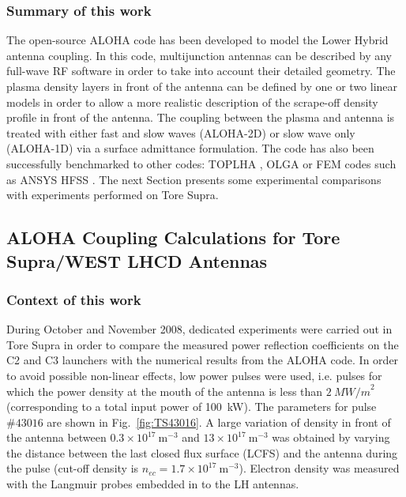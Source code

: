 \subsubsection{Summary of this work}
The open-source ALOHA code has been developed to model the Lower Hybrid antenna coupling. In this code, multijunction antennas can be described by any full-wave RF software in order to take into account their detailed geometry. The plasma density layers in front of the antenna can be defined by one or two linear models in order to allow a more realistic description of the scrape-off density profile in front of the antenna. The coupling between the plasma and antenna is treated with either fast and slow waves (ALOHA-2D) or slow wave only (ALOHA-1D) via a surface admittance formulation. The code has also been successfully benchmarked to other codes: TOPLHA , OLGA  or FEM codes such as ANSYS HFSS . The next Section presents some experimental comparisons with experiments performed on Tore Supra.

\clearpage

\subsection{ALOHA Coupling Calculations for Tore Supra/WEST LHCD Antennas}\label{sec:ALOHA_TS}
\subsubsection{Context of this work}
During October and November 2008, dedicated experiments were carried out in Tore Supra in order to compare the measured power reflection coefficients on the C2 and C3 launchers with the numerical results from the ALOHA code. In order to avoid possible non-linear effects\cite{petrzilka1987, ekedahl2009}, low power pulses were used, i.e. pulses for which the power density at the mouth of the antenna is less than $2~\si{MW/m}^2$ (corresponding to a total input power of 100~kW). The parameters for pulse $\#43016$ are shown in Fig.~\ref{fig:TS43016}. A large variation of density in front of the antenna between $0.3\times10^{17}~\mathrm{m}^{-3}$ and $13\times10^{17}~\mathrm{m}^{-3}$ was obtained by varying the distance between the last closed flux surface (LCFS) and the antenna during the pulse (cut-off density is $n_{ec}=1.7\times10^{17}~\mathrm{m}^{-3}$). Electron density was measured with the Langmuir probes embedded in to the LH antennas. 

